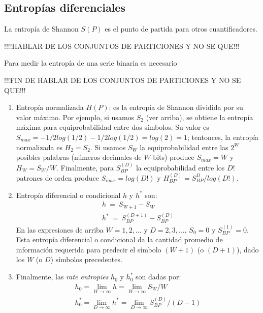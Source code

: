 \subsection{Entropías diferenciales}
\label{subsec:addquanti}

La entropía de Shannon $S(P)$ es el punto de partida para otros cuantificadores.

!!!!HABLAR DE LOS CONJUNTOS DE PARTICIONES Y NO SE QUE!!!

Para medir la entropía de una serie binaria es necesario 

!!!FIN DE HABLAR DE LOS CONJUNTOS DE PARTICIONES Y NO SE QUE!!!

\begin{enumerate}
	\item Entropía normalizada $H(P)$: es la entropía de Shannon dividida por su valor máximo. Por ejemplo, si usamos $S_2$ (ver arriba), se obtiene la entropía máxima para equiprobabilidad entre dos símbolos. Su valor es $S_{max}=-1/2 log(1/2)-1/2 log(1/2)=log(2)=1$; tentonces, la entropía normalizada es $H_2=S_2$. Si usamos $S_W$ la equiprobabilidad entre las $2^W$ posibles palabras (números decimales de $W$-bits) produce $S_{max}=W$ y $H_W=S_W/W$. Finalmente, para $S^{(D)}_{BP}$ la equiprobabilidad entre los $D!$ patrones de orden produce $S_{max}= log(D!)$ y $H^{(D)}_{BP}=S^D_{BP}/log(D!)$.
	\item Entropía diferencial o condicional $h$ y $h^*$ son:
	\begin{eqnarray}
	h~=~S_{W+1}-S_W\\
	h^*~=~S_{BP}^{(D+1)}-S_{BP}^{(D)}
	\end{eqnarray}
	En las expresiones de arriba $W=1,2,...$ y $D=2,3,...$, $S_0=0$ y $S_{BP}^{(1)}=0$. Esta entropía diferencial o condicional da la cantidad promedio de información requerida para predecir el símbolo $(W+1)$ (o $(D+1)$), dado los $W$ (o $D$) símbolos precedentes.
	\item Finalmente, las \emph{rate entropies} $h_0$ y $h_0^*$ \cite{Ebeling2001,Amigo2005} son dadas por:
	\begin{eqnarray}
	h_0=\lim\limits_{W\rightarrow \infty} h=\lim\limits_{W\rightarrow \infty}{S_{W}/W }\\
	h^*_0= \lim\limits_{D\rightarrow \infty} h^*=\lim\limits_{D\rightarrow \infty}{S^{(D)}_{BP}/(D-1)}
	\end{eqnarray}
\end{enumerate}

